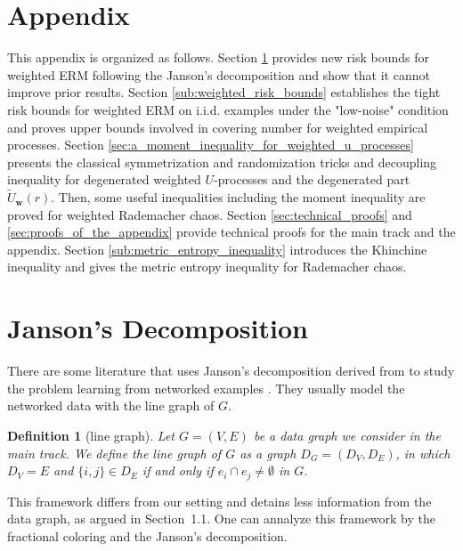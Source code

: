 \documentclass[letterpaper]{article} %
\newtheorem{definition}{Definition}
\newcommand{\weight}{\mathbf{w}}
\newcommand{\edge}[1]{\{#1\}}
\begin{document}
\newpage
\section*{Appendix} %
\appendix
\label{sec:appendix}

This appendix is organized as follows. Section \ref{sec:fractional_coloring_approach} provides new risk bounds for weighted ERM following the Janson's decomposition and show that it cannot improve prior results.
Section \ref{sub:weighted_risk_bounds} establishes the tight risk bounds for weighted ERM on i.i.d. examples under the "low-noise" condition and proves upper bounds involved in covering number for weighted empirical processes. 
Section \ref{sec:a_moment_inequality_for_weighted_u_processes} presents the classical symmetrization and randomization tricks and decoupling inequality for degenerated weighted $U$-processes and the degenerated part $\widetilde{U}_\weight{}(r)$.
Then, some useful inequalities including the moment inequality are proved for weighted Rademacher chaos.
Section \ref{sec:technical_proofs} and \ref{sec:proofs_of_the_appendix} provide technical proofs for the main track and the appendix.
Section \ref{sub:metric_entropy_inequality} introduces the Khinchine inequality and gives the metric entropy inequality for Rademacher chaos.

\section{Janson's Decomposition} %
\label{sec:fractional_coloring_approach}

There are some literature that uses Janson's decomposition derived from \cite{janson2004large} to study the problem learning from networked examples \cite{Usunier2005,Biau2006,ralaivola2009chromatic,DBLP:conf/icml/RalaivolaA15}.
They usually model the networked data with the line graph of $G$.
\begin{definition}[line graph]
  \label{de:line graph}
  Let $G=(V,E)$ be a data graph we consider in the main track. We define the line graph of $G$ as a graph $D_G = (D_V, D_E)$, in which $D_V = E$ and $\edge{i,j}\in D_E$ if and only if $e_i\cap e_j\neq\emptyset$ in $G$.
\end{definition}
This framework differs from our setting and detains less information from the data graph, as argued in Section~1.1. 
One can annalyze this framework by the fractional coloring and the Janson's decomposition.
\end{document}
